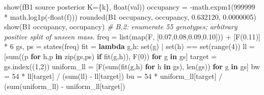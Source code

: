 \documentclass[
]{article}
\newenvironment{Shaded}{}{}
\newcommand{\BuiltInTok}[1]{\textcolor[rgb]{0.00,0.50,0.00}{#1}}
\newcommand{\CommentTok}[1]{\textcolor[rgb]{0.38,0.63,0.69}{\textit{#1}}}
\newcommand{\ControlFlowTok}[1]{\textcolor[rgb]{0.00,0.44,0.13}{\textbf{#1}}}
\newcommand{\DecValTok}[1]{\textcolor[rgb]{0.25,0.63,0.44}{#1}}
\newcommand{\FloatTok}[1]{\textcolor[rgb]{0.25,0.63,0.44}{#1}}
\newcommand{\KeywordTok}[1]{\textcolor[rgb]{0.00,0.44,0.13}{\textbf{#1}}}
\newcommand{\NormalTok}[1]{#1}
\newcommand{\OperatorTok}[1]{\textcolor[rgb]{0.40,0.40,0.40}{#1}}
\newcommand{\SpecialCharTok}[1]{\textcolor[rgb]{0.25,0.44,0.63}{#1}}
\newcommand{\SpecialStringTok}[1]{\textcolor[rgb]{0.73,0.40,0.53}{#1}}
\newcommand{\StringTok}[1]{\textcolor[rgb]{0.25,0.44,0.63}{#1}}
\begin{document}
\begin{Shaded}
\begin{Highlighting}[]
\NormalTok{        show(}\SpecialStringTok{f\textquotesingle{}B1 source posterior K=}\SpecialCharTok{\{}\NormalTok{k}\SpecialCharTok{\}}\SpecialStringTok{\textquotesingle{}}\NormalTok{, }\BuiltInTok{float}\NormalTok{(val))}
\NormalTok{    occupancy }\OperatorTok{=} \OperatorTok{{-}}\NormalTok{math.expm1(}\DecValTok{999999} \OperatorTok{*}\NormalTok{ math.log1p(}\OperatorTok{{-}}\BuiltInTok{float}\NormalTok{(f)))}
\NormalTok{    rounded(}\StringTok{\textquotesingle{}B1 occupancy\textquotesingle{}}\NormalTok{, occupancy, }\FloatTok{0.632120}\NormalTok{, }\FloatTok{0.0000005}\NormalTok{)}
\NormalTok{    show(}\StringTok{\textquotesingle{}B1 occupancy\textquotesingle{}}\NormalTok{, occupancy)}
    \CommentTok{\# B.2: enumerate 55 genotypes; arbitrary positive split of unseen mass.}
\NormalTok{    freq }\OperatorTok{=} \BuiltInTok{list}\NormalTok{(}\BuiltInTok{map}\NormalTok{(F, [}\StringTok{\textquotesingle{}0.07\textquotesingle{}}\NormalTok{,}\StringTok{\textquotesingle{}0.08\textquotesingle{}}\NormalTok{,}\StringTok{\textquotesingle{}0.09\textquotesingle{}}\NormalTok{,}\StringTok{\textquotesingle{}0.10\textquotesingle{}}\NormalTok{])) }\OperatorTok{+}\NormalTok{ [F(}\StringTok{\textquotesingle{}0.11\textquotesingle{}}\NormalTok{)] }\OperatorTok{*} \DecValTok{6}
\NormalTok{    gs, ps }\OperatorTok{=}\NormalTok{ states(freq)}
\NormalTok{    fit }\OperatorTok{=} \KeywordTok{lambda}\NormalTok{ g,h: }\BuiltInTok{set}\NormalTok{(g) }\OperatorTok{|} \BuiltInTok{set}\NormalTok{(h) }\OperatorTok{==} \BuiltInTok{set}\NormalTok{(}\BuiltInTok{range}\NormalTok{(}\DecValTok{4}\NormalTok{))}
\NormalTok{    ll }\OperatorTok{=}\NormalTok{ [}\BuiltInTok{sum}\NormalTok{((p }\ControlFlowTok{for}\NormalTok{ h,p }\KeywordTok{in} \BuiltInTok{zip}\NormalTok{(gs,ps) }\ControlFlowTok{if}\NormalTok{ fit(g,h)), F(}\DecValTok{0}\NormalTok{)) }\ControlFlowTok{for}\NormalTok{ g }\KeywordTok{in}\NormalTok{ gs]}
\NormalTok{    target }\OperatorTok{=}\NormalTok{ gs.index((}\DecValTok{1}\NormalTok{,}\DecValTok{2}\NormalTok{))}
\NormalTok{    uniform\_ll }\OperatorTok{=}\NormalTok{ [F(}\BuiltInTok{sum}\NormalTok{(fit(g,h) }\ControlFlowTok{for}\NormalTok{ h }\KeywordTok{in}\NormalTok{ gs), }\BuiltInTok{len}\NormalTok{(gs)) }\ControlFlowTok{for}\NormalTok{ g }\KeywordTok{in}\NormalTok{ gs]}
\NormalTok{    bw }\OperatorTok{=} \DecValTok{54} \OperatorTok{*}\NormalTok{ ll[target] }\OperatorTok{/}\NormalTok{ (}\BuiltInTok{sum}\NormalTok{(ll) }\OperatorTok{{-}}\NormalTok{ ll[target])}
\NormalTok{    bu }\OperatorTok{=} \DecValTok{54} \OperatorTok{*}\NormalTok{ uniform\_ll[target] }\OperatorTok{/}\NormalTok{ (}\BuiltInTok{sum}\NormalTok{(uniform\_ll) }\OperatorTok{{-}}\NormalTok{ uniform\_ll[target])}

\end{Highlighting}
\end{Shaded}
\end{document}
